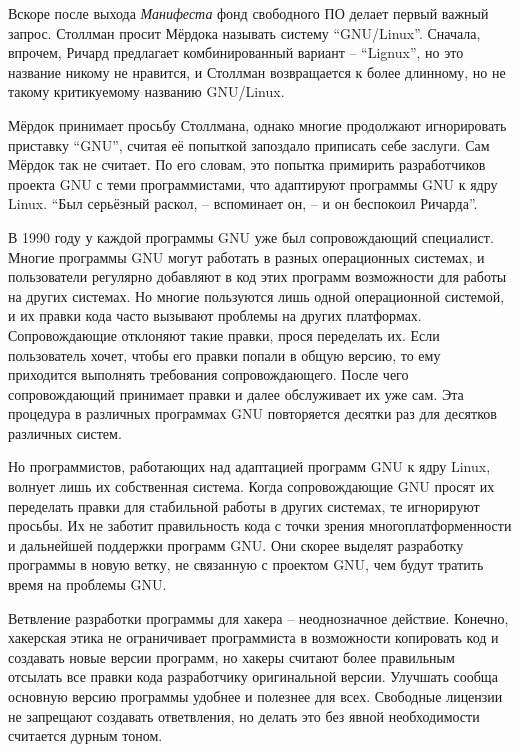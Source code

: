 Вскоре после выхода \textit{Манифеста} фонд свободного ПО делает первый важный запрос. Столлман просит Мёрдока называть систему ``GNU/Linux''. Сначала, впрочем, Ричард предлагает комбинированный вариант -- ``Lignux'', но это название никому не нравится, и Столлман возвращается к более длинному, но не такому критикуемому названию GNU/Linux.

Мёрдок принимает просьбу Столлмана, однако многие продолжают игнорировать приставку ``GNU'', считая её попыткой запоздало приписать себе заслуги. Сам Мёрдок так не считает. По его словам, это попытка примирить разработчиков проекта GNU с теми программистами, что адаптируют программы GNU к ядру Linux. ``Был серьёзный раскол, -- вспоминает он, -- и он беспокоил Ричарда''.

В 1990 году у каждой программы GNU уже был сопровождающий специалист. Многие программы GNU могут работать в разных операционных системах, и пользователи регулярно добавляют в код этих программ возможности для работы на других системах. Но многие пользуются лишь одной операционной системой, и их правки кода часто вызывают проблемы на других платформах. Сопровождающие отклоняют такие правки, прося переделать их. Если пользователь хочет, чтобы его правки попали в общую версию, то ему приходится выполнять требования сопровождающего. После чего сопровождающий принимает правки и далее обслуживает их уже сам. Эта процедура в различных программах GNU повторяется десятки раз для десятков различных систем.

Но программистов, работающих над адаптацией программ GNU к ядру Linux, волнует лишь их собственная система. Когда сопровождающие GNU просят их переделать правки для стабильной работы в других системах, те игнорируют просьбы. Их не заботит правильность кода с точки зрения многоплатформенности и дальнейшей поддержки программ GNU. Они скорее выделят разработку программы в новую ветку, не связанную с проектом GNU, чем будут тратить время на проблемы GNU.

Ветвление разработки программы для хакера -- неоднозначное действие. Конечно, хакерская этика не ограничивает программиста в возможности копировать код и создавать новые версии программ, но хакеры считают более правильным отсылать все правки кода разработчику оригинальной версии. Улучшать сообща основную версию программы удобнее и полезнее для всех. Свободные лицензии не запрещают создавать ответвления, но делать это без явной необходимости считается дурным тоном.

